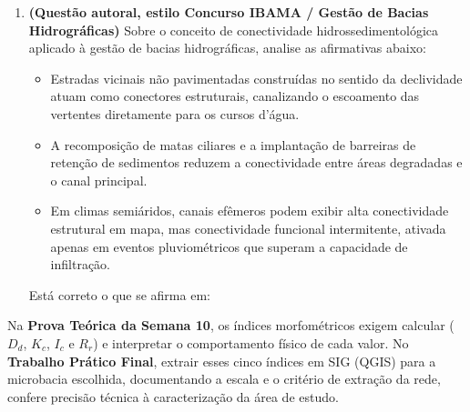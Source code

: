 \begin{enumerate}[leftmargin=1.8em, itemsep=5pt, start=16]
  \item \textbf{(Questão autoral, estilo Concurso IBAMA / Gestão de Bacias Hidrográficas)} Sobre o conceito de conectividade hidrossedimentológica aplicado à gestão de bacias hidrográficas, analise as afirmativas abaixo:
  \begin{itemize}[leftmargin=1.4em, itemsep=1.5pt]
    \item[I.] Estradas vicinais não pavimentadas construídas no sentido da declividade atuam como conectores estruturais, canalizando o escoamento das vertentes diretamente para os cursos d'água.
    \item[II.] A recomposição de matas ciliares e a implantação de barreiras de retenção de sedimentos reduzem a conectividade entre áreas degradadas e o canal principal.
    \item[III.] Em climas semiáridos, canais efêmeros podem exibir alta conectividade estrutural em mapa, mas conectividade funcional intermitente, ativada apenas em eventos pluviométricos que superam a capacidade de infiltração.
  \end{itemize}
  Está correto o que se afirma em:
\end{enumerate}

\begin{boxDica}
Na \textbf{Prova Teórica da Semana 10}, os índices morfométricos exigem calcular ($D_d$, $K_c$, $I_c$ e $R_r$) e interpretar o comportamento físico de cada valor. No \textbf{Trabalho Prático Final}, extrair esses cinco índices em SIG (QGIS) para a microbacia escolhida, documentando a escala e o critério de extração da rede, confere precisão técnica à caracterização da área de estudo.
\end{boxDica}

\clearpage
{}


